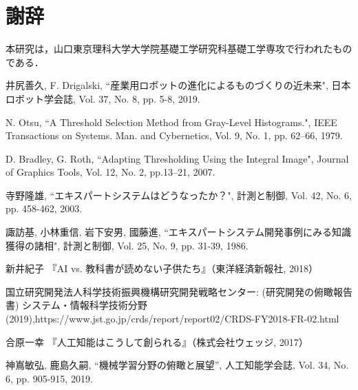 \documentclass{suribt}
\begin{document}
\chapter{謝辞}%
本研究は，山口東京理科大学大学院基礎工学研究科基礎工学専攻で行われたものである．
\begin{thebibliography}{}%
井尻善久, F. Drigalski, ``産業用ロボットの進化によるものづくりの近未来", 日本ロボット学会誌, Vol. 37, No. 8, pp. 5-8, 2019.

N. Otsu, ``A Threshold Selection Method from Gray-Level Histograms.", IEEE Transactions on Systems. Man. and Cybernetics, Vol. 9, No. 1, pp. 62–66, 1979.

D. Bradley, G. Roth, ``Adapting Thresholding Using the Integral Image", Journal of Graphics Tools, Vol. 12, No. 2, pp.13–21, 2007.

寺野隆雄, ``エキスパートシステムはどうなったか？", 計測と制御, Vol. 42, No. 6, pp. 458-462, 2003.

諏訪基, 小林重信, 岩下安男, 國藤進, ``エキスパートシステム開発事例にみる知識獲得の諸相", 計測と制御, Vol. 25, No. 9, pp. 31-39, 1986.

新井紀子 『AI vs. 教科書が読めない子供たち』（東洋経済新報社, 2018）

国立研究開発法人科学技術振興機構研究開発戦略センター: (研究開発の俯瞰報告書) システム・情報科学技術分野 (2019),https://www.jst.go.jp/crds/report/report02/CRDS-FY2018-FR-02.html

合原一幸 『人工知能はこうして創られる』（株式会社ウェッジ, 2017）

神嶌敏弘, 鹿島久嗣, ``機械学習分野の俯瞰と展望'', 人工知能学会誌, Vol. 34, No. 6, pp. 905-915, 2019.

\end{thebibliography}
\end{document}
